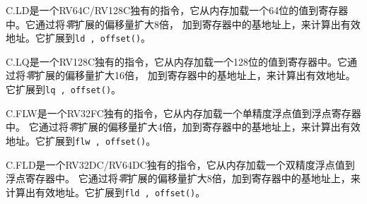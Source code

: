 C.LD是一个RV64C/RV128C独有的指令，它从内存加载一个64位的值到寄存器{\em \rdprime}中。它通过将{\em 零}扩展的偏移量扩大8倍，
加到寄存器{\em \rsoneprime}中的基地址上，来计算出有效地址。它扩展到{\tt ld \rdprime, offset(\rsoneprime)}。

C.LQ是一个RV128C独有的指令，它从内存加载一个128位的值到寄存器{\em \rdprime}中。它通过将{\em 零}扩展的偏移量扩大16倍，
加到寄存器{\em \rsoneprime}中的基地址上，来计算出有效地址。它扩展到{\tt lq \rdprime, offset(\rsoneprime)}。

C.FLW是一个RV32FC独有的指令，它从内存加载一个单精度浮点值到浮点寄存器{\em \rdprime}中。
它通过将{\em 零}扩展的偏移量扩大4倍，加到寄存器{\em \rsoneprime}中的基地址上，来计算出有效地址。它扩展到{\tt flw
\rdprime, offset(\rsoneprime)}。

C.FLD是一个RV32DC/RV64DC独有的指令，它从内存加载一个双精度浮点值到浮点寄存器{\em \rdprime}中。
它通过将{\em 零}扩展的偏移量扩大8倍，加到寄存器{\em \rsoneprime}中的基地址上，来计算出有效地址。它扩展到{\tt fld
\rdprime, offset(\rsoneprime)}。

